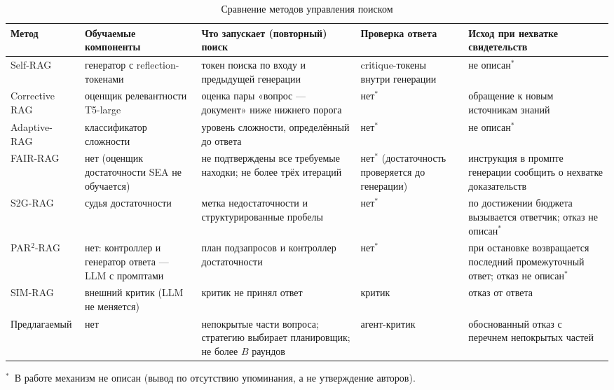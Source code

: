 \documentclass{misisarticle}
\begin{document}
\begin{table}[t]
  \caption{Сравнение методов управления поиском}
  \label{tab:related}
  \centering
  \footnotesize
  \begin{tabular}{@{}>{\raggedright\arraybackslash}p{2.2cm}>{\raggedright\arraybackslash}p{3.4cm}>{\raggedright\arraybackslash}p{4.3cm}>{\raggedright\arraybackslash}p{2.6cm}>{\raggedright\arraybackslash}p{4.3cm}@{}}
    \toprule
    \textbf{Метод} & \textbf{Обучаемые компоненты} & \textbf{Что запускает (повторный) поиск} & \textbf{Проверка ответа} & \textbf{Исход при нехватке свидетельств} \\
    \midrule
    Self-RAG~\cite{asai2023selfrag} & генератор с reflection-токенами & токен поиска по входу и предыдущей генерации & critique-токены внутри генерации & не описан$^{*}$ \\ %
    Corrective RAG~\cite{yan2024corrective} & оценщик релевантности T5-large & оценка пары «вопрос --- документ» ниже нижнего порога & нет$^{*}$ & обращение к новым источникам знаний \\ %
    Adaptive-RAG~\cite{jeong2024adaptive} & классификатор сложности & уровень сложности, определённый до ответа & нет$^{*}$ & не описан$^{*}$ \\ %
    FAIR-RAG~\cite{asl2025fairrag} & нет (оценщик достаточности SEA не обучается) & не подтверждены все требуемые находки; не более трёх итераций & нет$^{*}$ (достаточность проверяется до генерации) & инструкция в промпте генерации сообщить о нехватке доказательств \\ %
    S2G-RAG~\cite{li2026s2grag} & судья достаточности & метка недостаточности и структурированные пробелы & нет$^{*}$ & по достижении бюджета вызывается ответчик; отказ не описан$^{*}$ \\ %
    PAR$^2$-RAG~\cite{li2026par2} & нет: контроллер и генератор ответа --- LLM с промптами & план подзапросов и контроллер достаточности & нет$^{*}$ & при остановке возвращается последний промежуточный ответ; отказ не описан$^{*}$ \\ %
    SIM-RAG~\cite{yang2025knowing} & внешний критик (LLM не меняется) & критик не принял ответ & критик & отказ от ответа \\ %
    \midrule
    Предлагаемый & нет & непокрытые части вопроса; стратегию выбирает планировщик; не более $B$ раундов & агент-критик & обоснованный отказ с перечнем непокрытых частей \\
    \bottomrule
  \end{tabular}

  \vspace{2pt}
  \raggedright\footnotesize $^{*}$~В работе механизм не описан (вывод по отсутствию упоминания, а не утверждение авторов).
\end{table}
\end{document}
